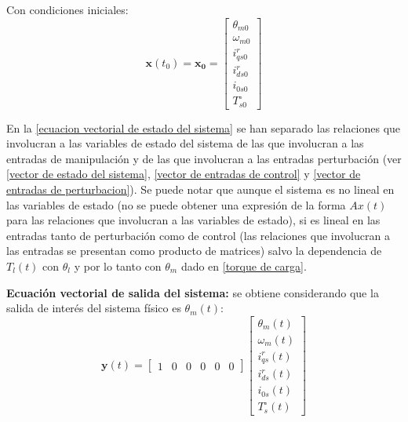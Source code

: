 \documentclass[a4paper, 10pt, onecolumn,journal]{ieeeconf}
\begin{document}
Con condiciones iniciales:
\begin{equation}
    \mathbf{x}(t_0) = \mathbf{x_0}
    =
    \begin{bmatrix} 
        \theta_{m0} \\ 
        \omega_{m0} \\ 
        i^r_{qs0} \\ 
        i^r_{ds0} \\ 
        i_{0s0} \\ 
        T^\circ_{s0} 
    \end{bmatrix}
\end{equation}

En la \cref{ecuacion vectorial de estado del sistema} se han separado
las relaciones que involucran a las variables de estado del sistema de las que involucran a las 
entradas de manipulación y de las que involucran a las entradas perturbación (ver \cref{vector de estado del sistema}, \cref{vector de entradas de control} y \cref{vector de entradas de perturbacion}). Se puede notar
que aunque el sistema es no lineal en las variables de estado (no se puede obtener una expresión de la forma $Ax(t)$ para las relaciones que involucran a las variables de estado), 
si es lineal en las entradas tanto de perturbación como de control (las relaciones que involucran a las entradas se presentan como producto de matrices) salvo la dependencia de $T_l(t)$ con $\theta_l$ y por lo tanto con $\theta_m$ 
dado en \cref{torque de carga}.

\textbf{Ecuación vectorial de salida del sistema:} se obtiene considerando que la salida de interés del sistema físico es $\theta_m(t)$:
\begin{equation}
    \mathbf{y}(t) = 
    \begin{bmatrix}
        1 & 0 & 0 & 0 & 0 & 0
    \end{bmatrix}
    \begin{bmatrix} \theta_m(t) \\ \omega_m(t) \\ i^r_{qs}(t) \\ i^r_{ds}(t) \\ i_{0s}(t) \\ T^\circ_s(t) \end{bmatrix}
    \label{ecuacion vectorial de salida del sistema}
\end{equation}
\end{document}
